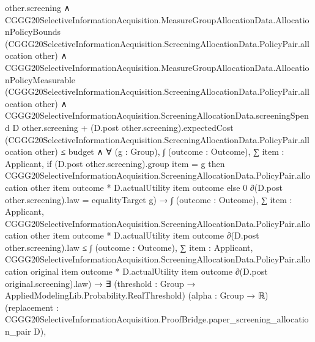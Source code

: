 \documentclass[10pt]{article}
\begin{document}
\begin{ReviewVerbatim}
                            other.screening ∧
                          CGGG20SelectiveInformationAcquisition.MeasureGroupAllocationData.AllocationPolicyBounds
                              (CGGG20SelectiveInformationAcquisition.ScreeningAllocationData.PolicyPair.allocation
                                other) ∧
                            CGGG20SelectiveInformationAcquisition.MeasureGroupAllocationData.AllocationPolicyMeasurable
                                (CGGG20SelectiveInformationAcquisition.ScreeningAllocationData.PolicyPair.allocation
                                  other) ∧
                              CGGG20SelectiveInformationAcquisition.ScreeningAllocationData.screeningSpend D
                                      other.screening +
                                    (D.post other.screening).expectedCost
                                      (CGGG20SelectiveInformationAcquisition.ScreeningAllocationData.PolicyPair.allocation
                                        other) ≤
                                  budget ∧
                                ∀ (g : Group),
                                  ∫ (outcome : Outcome),
                                      ∑ item : Applicant,
                                        if (D.post other.screening).group item = g then
                                          CGGG20SelectiveInformationAcquisition.ScreeningAllocationData.PolicyPair.allocation
                                              other item outcome *
                                            D.actualUtility item outcome
                                        else 0 ∂(D.post other.screening).law =
                                    equalityTarget g) →
                        ∫ (outcome : Outcome),
                            ∑ item : Applicant,
                              CGGG20SelectiveInformationAcquisition.ScreeningAllocationData.PolicyPair.allocation other
                                  item outcome *
                                D.actualUtility item outcome ∂(D.post other.screening).law ≤
                          ∫ (outcome : Outcome),
                            ∑ item : Applicant,
                              CGGG20SelectiveInformationAcquisition.ScreeningAllocationData.PolicyPair.allocation
                                  original item outcome *
                                D.actualUtility item outcome ∂(D.post original.screening).law) →
                  ∃ (threshold : Group → AppliedModelingLib.Probability.RealThreshold) (alpha : Group → ℝ) (replacement
                    : CGGG20SelectiveInformationAcquisition.ProofBridge.paper_screening_allocation_pair D),

\end{ReviewVerbatim}
\end{document}
